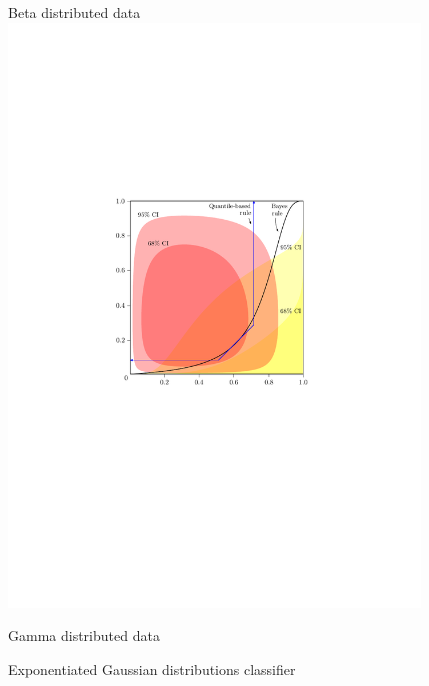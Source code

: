 \begin{figure}[ht]
  \caption{Exponentiated Gaussian distributions classifier}
  \label{fig:exponentiated-gaussian}
  \centering
  \vspace{5mm}

  \begin{minipage}[t]{0.49\linewidth} \vspace{0mm}
    \centering
    Beta distributed data \\[2ex]
    \includegraphics[width=0.975\textwidth]{beta_cqc}
  \end{minipage}
  \begin{minipage}[t]{0.49\linewidth} \vspace{0mm}
    \centering
    Gamma distributed data \\[2ex]

\end{minipage}
\end{figure}
